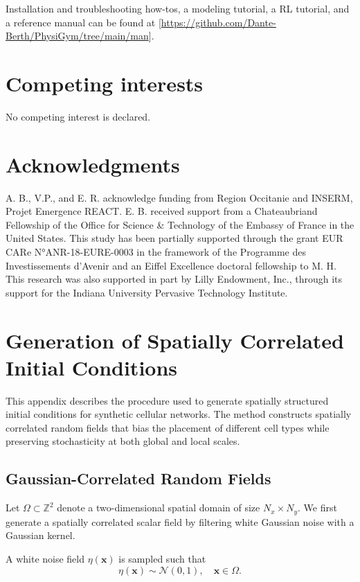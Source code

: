 \documentclass{article}
\begin{document}
Installation and troubleshooting how-tos, a modeling tutorial, a RL tutorial, and a reference manual can be found at [\url{https://github.com/Dante-Berth/PhysiGym/tree/main/man}].

\section{Competing interests}
No competing interest is declared.
\section{Acknowledgments}
A. B., V.P., and E. R. acknowledge funding from Region Occitanie and INSERM, Projet Emergence REACT. E. B. received support from a Chateaubriand Fellowship of the Office for Science \& Technology of the Embassy of France in the United States. This study has been partially supported through the grant EUR CARe N°ANR-18-EURE-0003 in the framework of the Programme des Investissements d’Avenir and an Eiffel Excellence doctoral fellowship to M. H. This research was also supported in part by Lilly Endowment, Inc., through its support for the Indiana University Pervasive Technology Institute. 
\newpage


\newpage

\appendix

\newpage
\section{Generation of Spatially Correlated Initial Conditions}
\label{app:initial_conditions}

This appendix describes the procedure used to generate spatially structured initial conditions for synthetic cellular networks. The method constructs spatially correlated random fields that bias the placement of different cell types while preserving stochasticity at both global and local scales.

\subsection{Gaussian-Correlated Random Fields}

Let $\Omega \subset \mathbb{Z}^2$ denote a two-dimensional spatial domain of size
$N_x \times N_y$. We first generate a spatially correlated scalar field by filtering white Gaussian noise with a Gaussian kernel.

A white noise field $\eta(\mathbf{x})$ is sampled such that
$$
\eta(\mathbf{x}) \sim \mathcal{N}(0,1), \quad \mathbf{x} \in \Omega.
$$
\end{document}
